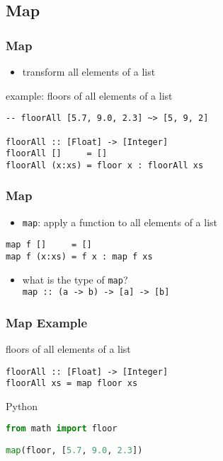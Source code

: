 \documentclass[dvipsnames]{beamer}
\theoremstyle{plain}
\begin{document}
\subsection{Map}

\begin{frame}[fragile]
  \frametitle{Map}

  \begin{itemize}
    \item transform all elements of a list
  \end{itemize}

  \begin{exampleblock}{example: floors of all elements of a list}
    \begin{lstlisting}
-- floorAll [5.7, 9.0, 2.3] ~> [5, 9, 2]

floorAll :: [Float] -> [Integer]
floorAll []     = []
floorAll (x:xs) = floor x : floorAll xs
    \end{lstlisting}
  \end{exampleblock}
\end{frame}

\begin{frame}[fragile]
  \frametitle{Map}

  \begin{itemize}
    \item \lstinline|map|: apply a function to all elements of a list
  \end{itemize}

  \begin{exampleblock}{}
    \begin{lstlisting}[deletekeywords={map}]
map f []     = []
map f (x:xs) = f x : map f xs
    \end{lstlisting}
  \end{exampleblock}

  \pause
  \begin{itemize}
    \item what is the type of \lstinline|map|?\\
      \lstinline|map :: (a -> b) -> [a] -> [b]|
  \end{itemize}
\end{frame}

\begin{frame}[fragile]
  \frametitle{Map Example}

  \begin{exampleblock}{floors of all elements of a list}
    \begin{lstlisting}
floorAll :: [Float] -> [Integer]
floorAll xs = map floor xs
    \end{lstlisting}
  \end{exampleblock}

  \bigskip
  \begin{exampleblock}{Python}
    \begin{lstlisting}[language=Python]
from math import floor

map(floor, [5.7, 9.0, 2.3])
    \end{lstlisting}
  \end{exampleblock}
\end{frame}
\end{document}
